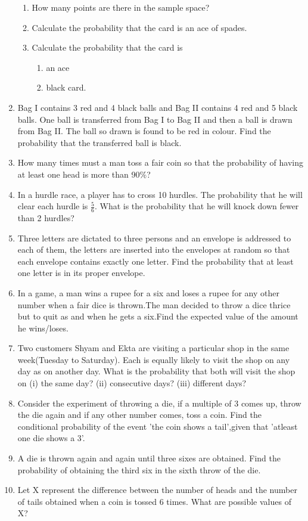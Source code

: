 \begin{enumerate}[label=\thechapter.\arabic*,ref=\thechapter.\theenumi]
\begin{enumerate}
\item How many points are there in the sample space?
\item Calculate the probability that the card is an ace of spades.
\item Calculate the probability that the card is 
           \begin{enumerate}
           \item an ace
           \item black card.
           \end{enumerate}
\end{enumerate}
\item Bag I contains 3 red and 4 black balls and Bag II contains 4 red and 5 black balls.
One ball is transferred from Bag I to Bag II and then a ball is drawn from Bag II.
The ball so drawn is found to be red in colour. Find the probability that the
transferred ball is black.
\item How many times must a man toss a fair coin so that the probability of having
at least one head is more than 90\%?
\item In a hurdle race, a player has to cross 10 hurdles. The probability that he will clear each hurdle is $\frac{5}{6}$. What is the probability that he will knock down fewer than 2 hurdles?
\item Three letters are dictated to three persons and an envelope is addressed to each
of them, the letters are inserted into the envelopes at random so that each envelope
contains exactly one letter. Find the probability that at least one letter is in its
proper envelope.
\item In a game, a man wins a rupee for a six and loses a rupee for any other number when a fair dice is thrown.The man decided to throw a dice thrice but to quit as and when he gets a six.Find the expected value of the amount he wins/loses.
\item Two customers Shyam and Ekta are visiting a particular shop in the same week(Tuesday to Saturday). Each is equally likely to visit the shop on any day as on another day. What is the probability that both will visit the shop on (i) the same day? (ii) consecutive days? (iii) different days?
\item Consider the experiment of throwing a die, if a multiple of 3 comes up, throw the die again and if any other number comes, toss a coin. Find the conditional probability of the event 'the coin shows a tail',given that 'atleast one die shows a 3'.
\item A die is thrown again and again until three sixes are obtained. Find the probability of obtaining the third six in the sixth throw of the die.
   \item Let X represent the difference between the number of heads and the number of
tails obtained when a coin is tossed 6 times. What are possible values of X?
\end{enumerate}
